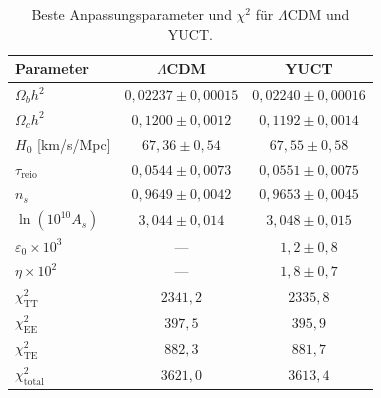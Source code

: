 \documentclass[11pt,a4paper]{article}
\begin{document}
	\begin{table}[H]
		\centering
		\caption{Beste Anpassungsparameter und $\chi^2$ für $\Lambda$CDM und YUCT.}
		\label{tab:results}
		\LARGE
		\begin{tabular}{lcc}
			\toprule
			Parameter & $\Lambda$CDM & YUCT \\
			\midrule
			$\Omega_b h^2$ & $0,02237 \pm 0,00015$ & $0,02240 \pm 0,00016$ \\
			$\Omega_c h^2$ & $0,1200 \pm 0,0012$ & $0,1192 \pm 0,0014$ \\
			$H_0$ [km/s/Mpc] & $67,36 \pm 0,54$ & $67,55 \pm 0,58$ \\
			$\tau_{\mathrm{reio}}$ & $0,0544 \pm 0,0073$ & $0,0551 \pm 0,0075$ \\
			$n_s$ & $0,9649 \pm 0,0042$ & $0,9653 \pm 0,0045$ \\
			$\ln(10^{10}A_s)$ & $3,044 \pm 0,014$ & $3,048 \pm 0,015$ \\
			$\varepsilon_0 \times 10^3$ & — & $1,2 \pm 0,8$ \\
			$\eta \times 10^2$ & — & $1,8 \pm 0,7$ \\
			\midrule
			$\chi^2_{\mathrm{TT}}$ & $2341,2$ & $2335,8$ \\
			$\chi^2_{\mathrm{EE}}$ & $397,5$ & $395,9$ \\
			$\chi^2_{\mathrm{TE}}$ & $882,3$ & $881,7$ \\
			$\chi^2_{\mathrm{total}}$ & $3621,0$ & $3613,4$ \\
			\bottomrule
		\end{tabular}
	\end{table}
	
\end{document}
